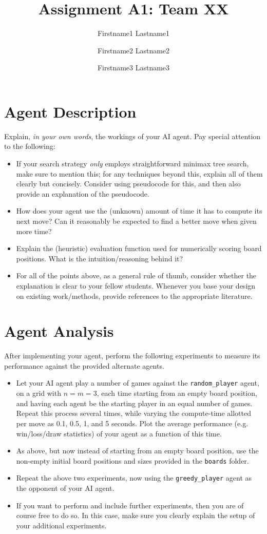 \documentclass[11pt]{article}
\title{Assignment A1: Team XX}
\author{Firstname1 Lastname1 \and Firstname2 Lastname2 \and Firstname3 Lastname3}
\date{}
\begin{document}
\maketitle


\section{Agent Description}\label{sec:description}
Explain, \emph{in your own words}, the workings of your AI agent. Pay special attention to the following:
\begin{itemize}
	\item If your search strategy \emph{only} employs straightforward minimax tree search, make sure to mention this; for any techniques beyond this, explain all of them clearly but concisely. Consider using pseudocode for this, and then also provide an explanation of the pseudocode. 
	\item How does your agent use the (unknown) amount of time it has to compute its next move? Can it reasonably be expected to find a better move when given more time?
	\item Explain the (heuristic) evaluation function used for numerically scoring board positions. What is the intuition/reasoning behind it?
	\item For all of the points above, as a general rule of thumb, consider whether the explanation is clear to your fellow students. Whenever you base your design on existing work/methods, provide references to the appropriate literature.
\end{itemize}


\section{Agent Analysis}\label{sec:analysis}
After implementing your agent, perform the following experiments to measure its performance against the provided alternate agents.
\begin{itemize}
	\item Let your AI agent play a number of games against the \texttt{random\_player} agent, on a grid with $n=m=3$, each time starting from an empty board position, and having each agent be the starting player in an equal number of games. Repeat this process several times, while varying the compute-time allotted per move as 0.1, 0.5, 1, and 5 seconds. Plot the average performance (e.g. win/loss/draw statistics) of your agent as a function of this time.
	\item As above, but now instead of starting from an empty board position, use the non-empty initial board positions and sizes provided in the \texttt{boards} folder.
	\item Repeat the above two experiments, now using the \texttt{greedy\_player} agent as the opponent of your AI agent.
	\item If you want to perform and include further experiments, then you are of course free to do so. In this case, make sure you clearly explain the setup of your additional experiments.
\end{itemize}
\end{document}
